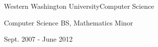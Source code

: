\documentclass{article}
\newenvironment{mylist}[2]{
  \subsubsection*{#1}
  \begin{multicols}{#2}
  \small
  \begin{list}{}{}
   \setlength{\topsep}{0pt}
   \setlength{\itemsep}{1pt}
   \setlength{\parskip}{0pt}
   \setlength{\parsep}{0pt}}{\end{list}\end{multicols}\normalsize}
\newenvironment{*mylist}[2]{
  \subsection*{#1\hfill#2}
  \small
  \begin{list}{}{}
   \setlength{\topsep}{0pt}
   \setlength{\itemsep}{1pt}
   \setlength{\parskip}{0pt}
   \setlength{\parsep}{0pt}}{\end{list}\normalsize}
\begin{document}
\begin{comment}
\begin{*mylist}{Extra Curricular}{MOOC/Bootcamp}
\item Coursera / EdX / Stanford Online / Hack Oregon
\end{*mylist}

\begin{mylist}{Courses :}{2}
\item {\em Linear Algebra Done Right}
\item {\em Simulation and Modeling of Natural Processes}
\item {\em Convex Optimization}
\item Functional Programming in Scala
\item Applied Cryptography
\item Agile Machine Learning
\end{mylist}
\end{comment}
\begin{comment}
\subsection*{Continued Education}

\begin{mylist}{Courses :}{2}
\item Agile Machine Learning
\item Functional Programming in Scala
\item Applied Cryptography
\end{mylist}
\end{comment}

\begin{*mylist}{Western Washington University}{Computer Science}
\item Computer Science BS, Mathematics Minor
\item Sept. 2007 - June 2012
\end{*mylist}
\end{document}
